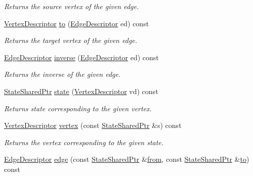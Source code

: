\begin{DoxyCompactItemize}
\begin{DoxyCompactList}\small\item\em Returns the source vertex of the given edge. \end{DoxyCompactList}\item 
\hyperlink{structStateGraph_a95d7ea26b0d0d07d3488068a8e9be53c}{Vertex\+Descriptor} \hyperlink{structStateGraph_a559e914bb1d10df20ab62be4ce667221}{to} (\hyperlink{structStateGraph_a419a555605bf486301b84dd6055d81f2}{Edge\+Descriptor} ed) const 
\begin{DoxyCompactList}\small\item\em Returns the target vertex of the given edge. \end{DoxyCompactList}\item 
\hyperlink{structStateGraph_a419a555605bf486301b84dd6055d81f2}{Edge\+Descriptor} \hyperlink{structStateGraph_a3226ff45a993dfbc990764aee7bc2b4f}{inverse} (\hyperlink{structStateGraph_a419a555605bf486301b84dd6055d81f2}{Edge\+Descriptor} ed) const 
\begin{DoxyCompactList}\small\item\em Returns the inverse of the given edge. \end{DoxyCompactList}\item 
\hyperlink{structStateGraph_a891fe4273003d7714f397f0d5dbae964}{State\+Shared\+Ptr} \hyperlink{structStateGraph_aaec2b2fe5bacd84b4d6e09bcdea23aec}{state} (\hyperlink{structStateGraph_a95d7ea26b0d0d07d3488068a8e9be53c}{Vertex\+Descriptor} vd) const 
\begin{DoxyCompactList}\small\item\em Returns state corresponding to the given vertex. \end{DoxyCompactList}\item 
\hyperlink{structStateGraph_a95d7ea26b0d0d07d3488068a8e9be53c}{Vertex\+Descriptor} \hyperlink{structStateGraph_a5add7b7f43281e8dd7429404a03e7633}{vertex} (const \hyperlink{structStateGraph_a891fe4273003d7714f397f0d5dbae964}{State\+Shared\+Ptr} \&s) const 
\begin{DoxyCompactList}\small\item\em Returns the vertex corresponding to the given state. \end{DoxyCompactList}\item 
\hyperlink{structStateGraph_a419a555605bf486301b84dd6055d81f2}{Edge\+Descriptor} \hyperlink{structStateGraph_ab727ef331d642fe37957d2d8e7fe13bb}{edge} (const \hyperlink{structStateGraph_a891fe4273003d7714f397f0d5dbae964}{State\+Shared\+Ptr} \&\hyperlink{structStateGraph_adedd93d0dea76929eaec98633c535d26}{from}, const \hyperlink{structStateGraph_a891fe4273003d7714f397f0d5dbae964}{State\+Shared\+Ptr} \&\hyperlink{structStateGraph_a559e914bb1d10df20ab62be4ce667221}{to}) const 

\end{DoxyCompactItemize}
